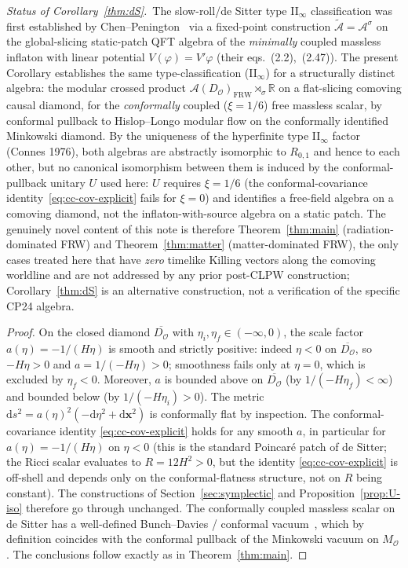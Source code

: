 \documentclass[11pt]{article}
\theoremstyle{definition}
\newcommand{\R}{\mathbb{R}}
\renewcommand{\AA}{\mathcal{A}}
\newcommand{\OO}{\mathcal{O}}
\newcommand{\FRW}{\mathrm{FRW}}
\begin{document}
\noindent\emph{Status of Corollary~\ref{thm:dS}.}~The slow-roll/de Sitter type II$_\infty$ classification was first established by Chen--Penington~\cite{ChenPenington2024} via a fixed-point construction $\widetilde{\mathcal{A}}=\mathcal{A}^\sigma$ on the global-slicing static-patch QFT algebra of the \emph{minimally} coupled massless inflaton with linear potential $V(\varphi)=V'\varphi$ (their eqs.~(2.2),~(2.47)). The present Corollary establishes the same type-classification (II$_\infty$) for a structurally distinct algebra: the modular crossed product $\AA(D_\OO)_\FRW \rtimes_\sigma \R$ on a flat-slicing comoving causal diamond, for the \emph{conformally} coupled ($\xi=1/6$) free massless scalar, by conformal pullback to Hislop--Longo modular flow on the conformally identified Minkowski diamond. By the uniqueness of the hyperfinite type II$_\infty$ factor (Connes 1976), both algebras are abstractly isomorphic to $R_{0,1}$ and hence to each other, but no canonical isomorphism between them is induced by the conformal-pullback unitary $U$ used here: $U$ requires $\xi=1/6$ (the conformal-covariance identity~\eqref{eq:cc-cov-explicit} fails for $\xi=0$) and identifies a free-field algebra on a comoving diamond, not the inflaton-with-source algebra on a static patch. The genuinely novel content of this note is therefore Theorem~\ref{thm:main} (radiation-dominated FRW) and Theorem~\ref{thm:matter} (matter-dominated FRW), the only cases treated here that have \emph{zero} timelike Killing vectors along the comoving worldline and are not addressed by any prior post-CLPW construction; Corollary~\ref{thm:dS} is an alternative construction, not a verification of the specific CP24 algebra.

\begin{proof}
On the closed diamond $\overline{D_\OO}$ with $\eta_i,\eta_f\in(-\infty,0)$, the scale factor $a(\eta)=-1/(H\eta)$ is smooth and strictly positive: indeed $\eta < 0$ on $\overline{D_\OO}$, so $-H\eta > 0$ and $a = 1/(-H\eta) > 0$; smoothness fails only at $\eta = 0$, which is excluded by $\eta_f < 0$. Moreover, $a$ is bounded above on $\overline{D_\OO}$ (by $1/(-H\eta_f) < \infty$) and bounded below (by $1/(-H\eta_i) > 0$). The metric $\mathrm{d}s^2 = a(\eta)^2(-\mathrm{d}\eta^2 + \mathrm{d}\mathbf{x}^2)$ is conformally flat by inspection. The conformal-covariance identity \eqref{eq:cc-cov-explicit} holds for any smooth $a$, in particular for $a(\eta) = -1/(H\eta)$ on $\eta < 0$ (this is the standard Poincar\'e patch of de Sitter; the Ricci scalar evaluates to $R = 12 H^2 > 0$, but the identity \eqref{eq:cc-cov-explicit} is off-shell and depends only on the conformal-flatness structure, not on $R$ being constant). The constructions of Section~\ref{sec:symplectic} and Proposition~\ref{prop:U-iso} therefore go through unchanged. The conformally coupled massless scalar on de Sitter has a well-defined Bunch--Davies / conformal vacuum~\cite[\S5.4]{Wald1994}, which by definition coincides with the conformal pullback of the Minkowski vacuum on $M_\OO$. The conclusions follow exactly as in Theorem~\ref{thm:main}.
\end{proof}
\end{document}
